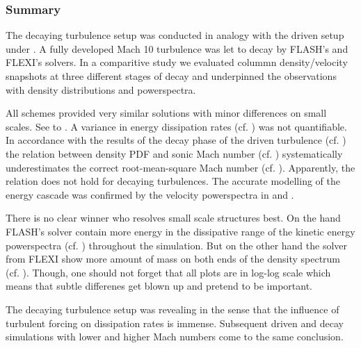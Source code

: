 % 

\newpage

\subsubsection{Summary}
The decaying turbulence setup was conducted in analogy with the driven
setup under . A fully developed Mach 10 turbulence was
let to decay by FLASH's and FLEXI's solvers. In a comparitive study
we evaluated colummn density/velocity snapshots at three different
stages of decay and underpinned the observations with density
distributions and powerspectra.

All schemes provided very similar solutions with minor differences on small
scales. See  to
.  A variance in energy dissipation rates
(cf. ) was not quantifiable.  In accordance
with the results of the decay phase of the driven turbulence (cf.
) the relation between density PDF and sonic Mach number (cf.
) systematically underestimates the correct
root-mean-square Mach number (cf.
). Apparently, the relation does
not hold for decaying turbulences. The accurate modelling of the energy cascade
was confirmed by the velocity powerspectra in
 and
.

There is no clear winner who resolves small scale structures best.  On the
hand FLASH's solver contain more energy in the dissipative range of the kinetic
energy powerspectra (cf. ) throughout
the simulation. But on the other hand the solver from FLEXI show more amount of
mass on both ends of the density spectrum (cf.
). Though, one should not forget that
all plots are in log-log scale which means that subtle differenes get blown
up and pretend to be important.

The decaying turbulence setup was revealing in the sense that the influence of
turbulent forcing on dissipation rates is immense. Subsequent driven and decay
simulations with lower and higher Mach numbers come to the same conclusion.
